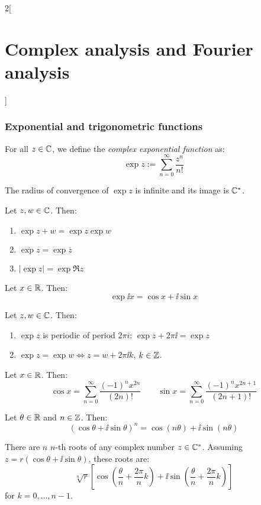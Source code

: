 \documentclass[../../../main.tex]{subfiles}
\begin{document}
\begin{multicols}{2}[\section{Complex analysis and Fourier analysis}]
  \subsubsection{Exponential and trigonometric functions}
  \begin{definition}
    For all $z \in \mathbb{C}$, we define the \textit{complex exponential function} as: $$\exp{z}:=\sum_{n=0}^\infty\frac{z^n}{n!}$$
  \end{definition}
  \begin{prop}
    The radius of convergence of $\exp{z}$ is infinite and its image is $\mathbb{C}^*$.
  \end{prop}
  \begin{prop}
    Let $z,w\in\mathbb{C}$. Then:
    \begin{enumerate}
      \item $\exp{z+w}=\exp{z}\exp{w}$
      \item $\overline{\exp{z}}=\exp{\overline{z}}$
      \item $|\exp{z}|=\exp{\Re z}$
    \end{enumerate}
  \end{prop}
  \begin{corollary}
    Let $x\in\mathbb{R}$. Then: $$\exp{\ii x}=\cos x+\ii \sin x$$
  \end{corollary}
  \begin{corollary}
    Let $z,w\in\mathbb{C}$. Then:
    \begin{enumerate}
      \item $\exp{z}$ is periodic of period $2\pi i$: $\exp{z+2\pi \ii}=\exp{z}$
      \item $\exp{z}=\exp{w}\iff z=w+2\pi \ii k$, $k\in\mathbb{Z}$.
    \end{enumerate}
  \end{corollary}
  \begin{corollary}
    Let $x\in\mathbb{R}$. Then: $$\cos x=\sum_{n=0}^\infty\frac{(-1)^nx^{2n}}{(2n)!}\qquad\sin x=\sum_{n=0}^\infty\frac{(-1)^nx^{2n+1}}{(2n+1)!}$$
  \end{corollary}
  \begin{prop}
    Let $\theta\in\mathbb{R}$ and $n\in\mathbb{Z}$. Then: $${(\cos{\theta} + \ii\sin{\theta})}^n = \cos{(n\theta)} + \ii\sin{(n\theta)}$$
  \end{prop}
  \begin{theorem}
    There are $n$ $n$-th roots of any complex number $z\in \mathbb{C}^*$. Assuming $z=r(\cos\theta + \ii\sin\theta)$, these roots are: $$\sqrt[n]{r}\left[\cos\left(\frac{\theta}{n}+\frac{2\pi}{n}k\right)+\ii\sin\left(\frac{\theta}{n}+\frac{2\pi}{n}k\right)\right]$$ for $k=0,\ldots,n-1$.

\end{theorem}
\end{multicols}
\end{document}
